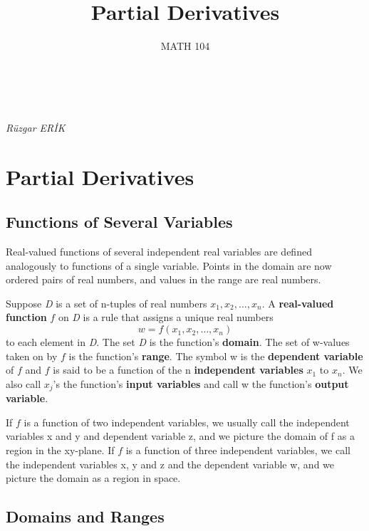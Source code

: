 \documentclass[12pt,a4paper]{article}
\makeatletter
\newenvironment{definition}{\begin{definitionbox}}{\end{definitionbox}\vspace{1\baselineskip}}
\renewcommand{\maketitle}{%
  \thispagestyle{firstpage} %
  \begin{tcolorbox}[colback=white,colframe=black,width=\textwidth,arc=0mm,auto outer arc]
    \begin{center}
      \Large \@title \\[1ex] \large \@date \\ \textit{Rüzgar ERİK}
    \end{center}
  \end{tcolorbox}
}
\makeatother
\begin{document}
\title{Partial Derivatives}
\date{MATH 104}
\maketitle
\tableofcontents %

\newpage %

\section{Partial Derivatives}
\subsection{Functions of Several Variables}

Real-valued functions of several independent real variables are defined analogously to functions of a single variable. Points in the domain are now ordered pairs of real numbers, and values in the range are real numbers.

\begin{definition}
    Suppose \textit{D} is a set of n-tuples of real numbers \(x_1, x_2, \dots, x_n\).
    A \textbf{real-valued function} \(f\) on \textit{D} is a rule that assigns a unique real numbers
    \[w = f(x_1, x_2, \dots, x_n)\]
    to each element in \textit{D}. The set \textit{D} is the function's \textbf{domain}. The set of w-values taken on by \(f\) is the function's \textbf{range}. The symbol w is the \textbf{dependent variable} of \(f\) and \(f\) is said to be a function of the n \textbf{independent variables} \(x_1\) to \(x_n\).
    We also call \(x_j\)'s the function's \textbf{input variables} and call w the function's \textbf{output variable}.

\end{definition}


\noindent If \(f\) is a function of two independent variables, we usually call the independent variables x and y and dependent variable z, and we picture the domain of f as a region in the xy-plane.
If \(f\) is a function of three independent variables, we call the independent variables x, y and z and the dependent variable w, and we picture the domain as a region in space.




\subsection{Domains and Ranges}
\end{document}
